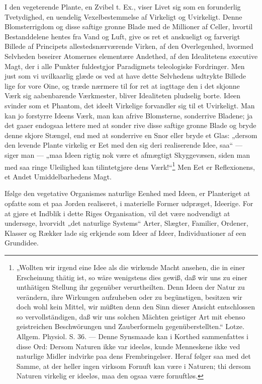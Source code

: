 \documentclass[11pt]{book}
\newcommand{\opage}[1]{\marginnote{\footnotesize\textit{[#1]}}}
\begin{document}
I den vegeterende Plante, en Zvibel t. Ex., viser Livet sig som en
forunderlig Tvetydighed, en uendelig Vexelbestemmelse af Virkeligt og
Uvirkeligt. Denne Blomsterrigdom og disse saftige gronne Blade med
de Millioner af Celler, hvortil Bestanddelene hentes fra Vand og
Luft, give os ret et anskueligt og farverigt Billede af Principets
allestedsnærværende Virken, af den Overlegenhed, hvormed Selvheden
beseirer Atomernes elementære Andethed, af den Idealitetens executive
Magt, der i alle Punkter fuldestgjor Paradigmets teleologiske
Fordringer. Men just som vi uvilkaarlig glæde os ved at have dette
Selvhedens udtrykte Billede lige for vore Oine, og træde nærmere til
for ret at iagttage den i det skjonne Værk sig aabenbarende
Værkmester, bliver Idealiteten pludselig borte. Ideen svinder som et
Phantom, det ideelt Virkelige forvandler sig til et Uvirkeligt. Man
kan jo forstyrre Ideens Værk, man kan afrive Blomsterne,
sonderrive Bladene; ja det gaaer endogsaa lettere med at sonder\-%
rive disse saftige gronne Blade og bryde denne skjore Stængel, end
med at sonderrive en Snor eller bryde et Glas: „dersom den levende
Plante virkelig er Eet med den sig deri
\opage{319} \setcounter{footnote}{0}%
realiserende Idee, saa“ --- siger man --- „maa Ideen rigtig\-%
nok være et afmægtigt Skyggevæsen, siden man med saa ringe
Uleilighed kan tilintetgjøre dens Værk!“\footnote{„Wollten wir irgend
eine Idee als die wirkende Macht ansehen, die in einer Erscheinung
thätig ist, so wäre wenigstens dies gewiß, daß wir uns zu einer
unthätigen Stellung ihr gegenüber verurtheilten. Denn Ideen der Natur
zu verändern, ihre Wirkungen aufzuheben oder zu begünstigen, besitzen
wir doch wohl kein Mittel, wir müßten denn den Sinn dieser Ansicht
entschlossen so vervollständigen, daß wir uns solchen Mächten
geistiger Art mit ebenso geistreichen Beschwörungen und
Zauberformeln gegenüberstellten.“ Lotze. Allgem. Physiol. S. 36. ---
Denne Synsmaade kan i Korthed sammenfattes i disse Ord: Dersom
Naturen ikke var ideeløs, kunde Menneskene ikke ved naturlige Midler
indvirke paa dens Frembringelser. Heraf følger saa med det Samme,
at der heller ingen virksom Fornuft kan være i Naturen; thi dersom
Naturen virkelig er ideeløs, maa den ogsaa være fornuftløs.} Men Eet
er Reflexionens, et Andet Umiddelbarhedens Magt.

Ifølge den vegetative Organismes naturlige Eenhed med Ideen, er
Planteriget at opfatte som et paa Jorden realiseret, i materielle Former
udpræget, Ideerige. For at gjøre et Indblik i dette Riges
Organisation, vil det være nodvendigt at undersøge, hvorvidt „det
naturlige Systems“ Arter, Slægter, Familier, Ordener, Klasser og
Rækker lade sig erkjende som Ideer af Ideer, Individuationer af een
Grundidee.
\end{document}
